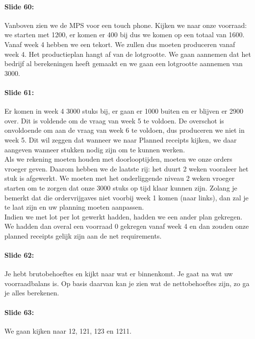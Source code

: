 \documentclass[10pt,a4paper]{report}
\begin{document}
\paragraph{Slide 60:} Vanboven zien we de MPS voor een touch phone. Kijken we naar onze voorraad: we starten met 1200, er komen er 400 bij dus we komen op een totaal van 1600. Vanaf week 4 hebben we een tekort. We zullen dus moeten produceren vanaf week 4. Het productieplan hangt af van de lotgrootte. We gaan aannemen dat het bedrijf al berekeningen heeft gemaakt en we gaan een lotgrootte aannemen van 3000. 

\paragraph{Slide 61:} %
Er komen in week 4 3000 stuks bij, er gaan er 1000 buiten en er blijven er 2900 over. Dit is voldende om de vraag van week 5 te voldoen. De overschot is onvoldoende om aan de vraag van week 6 te voldoen, dus produceren we niet in week 5. Dit wil zeggen dat wanneer we naar Planned receipts kijken, we daar aangeven wanneer stukken nodig zijn om te kunnen werken.\\ 
Als we rekening moeten houden met doorlooptijden, moeten we onze orders vroeger geven. Daarom hebben we de laatste rij: het duurt 2 weken vooraleer het stuk is afgewerkt. We moeten met het onderliggende niveau 2 weken vroeger starten om te zorgen dat onze 3000 stuks op tijd klaar kunnen zijn. Zolang je bemerkt dat die ordervrijgaves niet voorbij week 1 komen (naar links), dan zal je te laat zijn en uw planning moeten aanpassen.\\ 
Indien we met lot per lot gewerkt hadden, hadden we een ander plan gekregen. We hadden dan overal een voorraad 0 gekregen vanaf week 4 en dan zouden onze planned receipts gelijk zijn aan de net requirements.

\paragraph{Slide 62:} Je hebt brutobehoeftes en kijkt naar wat er binnenkomt. Je gaat na wat uw voorraadbalans is. Op basis daarvan kan je zien wat de nettobehoeftes zijn, zo ga je alles berekenen.

\paragraph{Slide 63:} We gaan kijken naar 12, 121, 123 en 1211.
\end{document}
